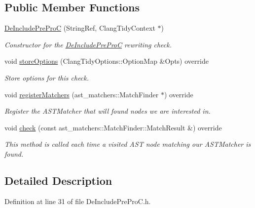 \subsection*{Public Member Functions}
\begin{DoxyCompactItemize}
\item 
\hyperlink{classclang_1_1tidy_1_1pagesjaunes_1_1_de_include_pre_pro_c_ab816dc100fb59f062328b7f8f44905cd}{De\+Include\+Pre\+ProC} (String\+Ref, Clang\+Tidy\+Context $\ast$)
\begin{DoxyCompactList}\small\item\em Constructor for the {\ttfamily \hyperlink{classclang_1_1tidy_1_1pagesjaunes_1_1_de_include_pre_pro_c}{De\+Include\+Pre\+ProC}} rewriting check. \end{DoxyCompactList}\item 
void \hyperlink{classclang_1_1tidy_1_1pagesjaunes_1_1_de_include_pre_pro_c_a9367e569272a7897ae9f899a5d36fea6}{store\+Options} (Clang\+Tidy\+Options\+::\+Option\+Map \&Opts) override
\begin{DoxyCompactList}\small\item\em Store options for this check. \end{DoxyCompactList}\item 
void \hyperlink{classclang_1_1tidy_1_1pagesjaunes_1_1_de_include_pre_pro_c_a106ba63622e7283145e674287dc8749a}{register\+Matchers} (ast\+\_\+matchers\+::\+Match\+Finder $\ast$) override
\begin{DoxyCompactList}\small\item\em Register the A\+S\+T\+Matcher that will found nodes we are interested in. \end{DoxyCompactList}\item 
void \hyperlink{classclang_1_1tidy_1_1pagesjaunes_1_1_de_include_pre_pro_c_ab9a11b66717687f7260093f83304fe33}{check} (const ast\+\_\+matchers\+::\+Match\+Finder\+::\+Match\+Result \&) override
\begin{DoxyCompactList}\small\item\em This method is called each time a visited A\+ST node matching our A\+S\+T\+Matcher is found. \end{DoxyCompactList}\end{DoxyCompactItemize}


\subsection{Detailed Description}


Definition at line 31 of file De\+Include\+Pre\+Pro\+C.\+h.




